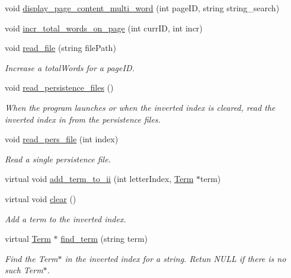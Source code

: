 \begin{DoxyCompactItemize}
void \hyperlink{class_index_interface_a84a8a73238c9d07c3992aa16b023db81}{display\+\_\+page\+\_\+content\+\_\+multi\+\_\+word} (int page\+I\+D, string string\+\_\+search)
\item 
void \hyperlink{class_index_interface_a5734b1488a787d47984bf97ffa5aff8d}{incr\+\_\+total\+\_\+words\+\_\+on\+\_\+page} (int curr\+I\+D, int incr)
\item 
void \hyperlink{class_index_interface_a229f1eb93f38d85d78e64e579c46c98a}{read\+\_\+file} (string file\+Path)
\begin{DoxyCompactList}\small\item\em Increase a total\+Words for a page\+I\+D. \end{DoxyCompactList}\item 
void \hyperlink{class_index_interface_aebcf89c2fd27b815b697c8e9d29e0c3a}{read\+\_\+persistence\+\_\+files} ()
\begin{DoxyCompactList}\small\item\em When the program launches or when the inverted index is cleared, read the inverted index in from the persistence files. \end{DoxyCompactList}\item 
void \hyperlink{class_index_interface_a0ca6250b71da3983ca31afdf3ee6dd88}{read\+\_\+pers\+\_\+file} (int index)
\begin{DoxyCompactList}\small\item\em Read a single persistence file. \end{DoxyCompactList}\item 
virtual void \hyperlink{class_index_interface_aa83b7083d107869e3519c5862bc71d0a}{add\+\_\+term\+\_\+to\+\_\+ii} (int letter\+Index, \hyperlink{class_term}{Term} $\ast$term)
\item 
virtual void \hyperlink{class_index_interface_ad7b88501f360ccfad0c1ee08d793ca25}{clear} ()
\begin{DoxyCompactList}\small\item\em Add a term to the inverted index. \end{DoxyCompactList}\item 
virtual \hyperlink{class_term}{Term} $\ast$ \hyperlink{class_index_interface_a851f0396f0b390cc9aa8cde270afffc9}{find\+\_\+term} (string term)
\begin{DoxyCompactList}\small\item\em Find the Term$\ast$ in the inverted index for a string. Retun N\+U\+L\+L if there is no such Term$\ast$. \end{DoxyCompactList}\item 

\end{DoxyCompactItemize}

